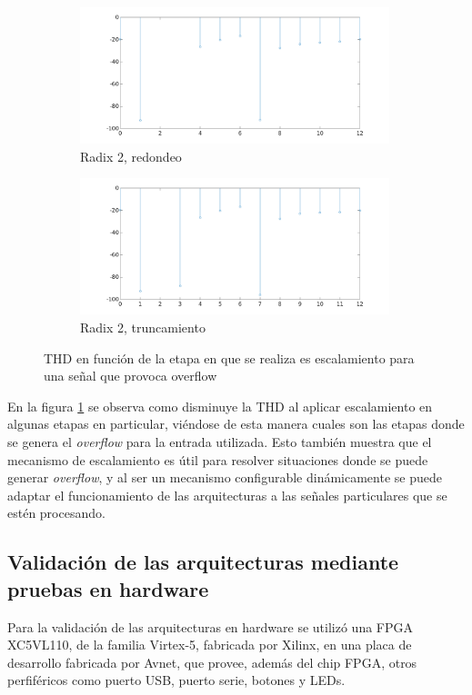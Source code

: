 \begin{figure}[htbp!]
        \advance\leftskip-1.5cm
        \begin{subfigure}{0.6\textwidth}%
        \includegraphics[width=9cm]{./figures/r2_16_4096_mul_scale_thd_05_red.png}
        \caption{Radix 2, redondeo}
        \end{subfigure}%
        \begin{subfigure}{0.6\textwidth}%
        \includegraphics[width=9cm]{./figures/r2_16_4096_mul_scale_thd_05_trunc.png}
        \caption{Radix 2, truncamiento}
        \end{subfigure}
        \caption{THD en función de la etapa en que se realiza es escalamiento para una señal que
        provoca overflow}
        \label{fig:escTHD_2}
\end{figure}

En la figura \ref{fig:escTHD_2} se observa como disminuye la THD al aplicar escalamiento en algunas
etapas en particular, viéndose de esta manera cuales son las etapas donde se genera el
\textit{overflow} para la entrada utilizada. Esto también muestra que el mecanismo de escalamiento
es útil para resolver situaciones donde se puede generar \textit{overflow}, y al ser un mecanismo
configurable dinámicamente se puede adaptar el funcionamiento de las arquitecturas a las señales
particulares que se estén procesando.

\subsection{Validación de las arquitecturas mediante pruebas en hardware}

Para la validación de las arquitecturas en hardware se utilizó una FPGA XC5VL110, de la familia
Virtex-5, fabricada por Xilinx, en una placa de desarrollo fabricada por Avnet, que provee, además
del chip FPGA, otros perfiféricos como puerto USB, puerto serie, botones y LEDs.

